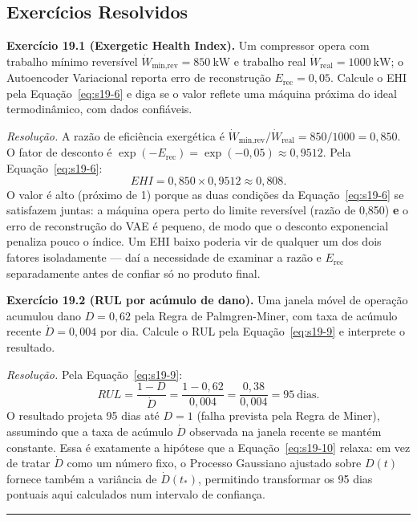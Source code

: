\documentclass[12pt,a4paper]{article}
\numberwithin{equation}{section}
\numberwithin{table}{section}
\numberwithin{figure}{section}
\begin{document}
{\subsection{Exercícios Resolvidos}

\textbf{Exercício 19.1 (Exergetic Health Index).} Um compressor opera com
trabalho mínimo reversível $\dot{W}_{\text{min,rev}} = 850\ \mathrm{kW}$ e
trabalho real $\dot{W}_{\text{real}} = 1000\ \mathrm{kW}$; o Autoencoder
Variacional reporta erro de reconstrução $E_{\text{rec}} = 0{,}05$. Calcule
o EHI pela Equação~\eqref{eq:s19-6} e diga se o valor reflete uma máquina
próxima do ideal termodinâmico, com dados confiáveis.

\emph{Resolução.} A razão de eficiência exergética é
$\dot{W}_{\text{min,rev}}/\dot{W}_{\text{real}} = 850/1000 = 0{,}850$. O
fator de desconto é $\exp(-E_{\text{rec}}) = \exp(-0{,}05) \approx 0{,}9512$.
Pela Equação~\eqref{eq:s19-6}:
$$EHI = 0{,}850 \times 0{,}9512 \approx 0{,}808.$$
O valor é alto (próximo de 1) porque as duas condições da
Equação~\eqref{eq:s19-6} se satisfazem juntas: a máquina opera perto do
limite reversível (razão de 0,850) \textbf{e} o erro de reconstrução do VAE
é pequeno, de modo que o desconto exponencial penaliza pouco o índice. Um
EHI baixo poderia vir de qualquer um dos dois fatores isoladamente --- daí
a necessidade de examinar a razão e $E_{\text{rec}}$ separadamente antes de
confiar só no produto final.

\textbf{Exercício 19.2 (RUL por acúmulo de dano).} Uma janela móvel de
operação acumulou dano $D = 0{,}62$ pela Regra de Palmgren-Miner, com taxa
de acúmulo recente $\dot{D} = 0{,}004$ por dia. Calcule o RUL pela
Equação~\eqref{eq:s19-9} e interprete o resultado.

\emph{Resolução.} Pela Equação~\eqref{eq:s19-9}:
$$RUL = \frac{1 - D}{\dot{D}} = \frac{1 - 0{,}62}{0{,}004} =
\frac{0{,}38}{0{,}004} = 95\ \text{dias}.$$
O resultado projeta 95 dias até $D = 1$ (falha prevista pela Regra de
Miner), assumindo que a taxa de acúmulo $\dot{D}$ observada na janela
recente se mantém constante. Essa é exatamente a hipótese que a
Equação~\eqref{eq:s19-10} relaxa: em vez de tratar $\dot{D}$ como um número
fixo, o Processo Gaussiano ajustado sobre $D(t)$ fornece também a variância
de $\dot{D}(t_*)$, permitindo transformar os 95 dias pontuais aqui
calculados num intervalo de confiança.

\vspace{1em}
\hrule
\vspace{1em}

}
\end{document}
